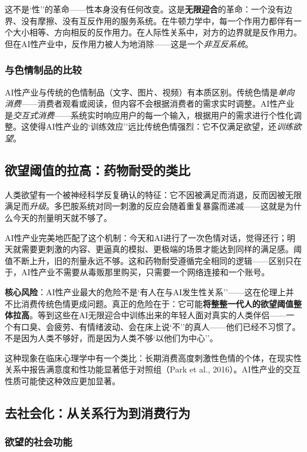 \documentclass[12pt,a4paper]{ctexart}
\begin{document}
这不是`性''的革命——性本身没有任何改变。这是\textbf{无限迎合}的革命：一个没有边界、没有摩擦、没有互反作用的服务系统。在牛顿力学中，每一个作用力都伴有一个大小相等、方向相反的反作用力。在人际性关系中，对方的边界就是反作用力。但在AI性产业中，反作用力被人为地消除——这是一个\emph{非互反系统}。

\subsubsection{与色情制品的比较}

AI性产业与传统的色情制品（文字、图片、视频）有本质区别。传统色情是\emph{单向消费}——消费者观看或阅读，但内容不会根据消费者的需求实时调整。AI性产业是\emph{交互式消费}——系统实时响应用户的每一个输入，根据用户的需求进行个性化调整。这使得AI性产业的`训练效应''远比传统色情强烈：它不仅满足欲望，还\emph{训练欲望}。

\subsection{欲望阈值的拉高：药物耐受的类比}

人类欲望有一个被神经科学反复确认的特征：它不因被满足而消退，反而因被无限满足而\emph{升级}。多巴胺系统对同一刺激的反应会随着重复暴露而递减——这就是为什么今天的剂量明天就不够了。

AI性产业完美地匹配了这个机制：今天和AI进行了一次色情对话，觉得还行；明天就需要更刺激的内容、更逼真的模拟、更极端的场景才能达到同样的满足感。阈值不断上升，旧的剂量永远不够。这和药物耐受遵循完全相同的逻辑——区别只在于，AI性产业不需要从毒贩那里购买，只需要一个网络连接和一个账号。

\textbf{核心风险}：AI性产业最大的危险不是`有人在与AI发生性关系''——这在伦理上并不比消费传统色情更成问题。真正的危险在于：它可能\textbf{将整整一代人的欲望阈值整体拉高}。等到这些在AI无限迎合中训练出来的年轻人面对真实的人类伴侣——一个有口臭、会疲劳、有情绪波动、会在床上说`不''的真人——他们已经不习惯了。不是因为人类不够好，而是因为人类不够`以他们为中心''。

这种现象在临床心理学中有一个类比：长期消费高度刺激性色情的个体，在现实性关系中报告满意度和性功能显著低于对照组（Park et al., 2016）。AI性产业的交互性质可能使这种效应更加显著。

\subsection{去社会化：从关系行为到消费行为}

\subsubsection{欲望的社会功能}
\end{document}
